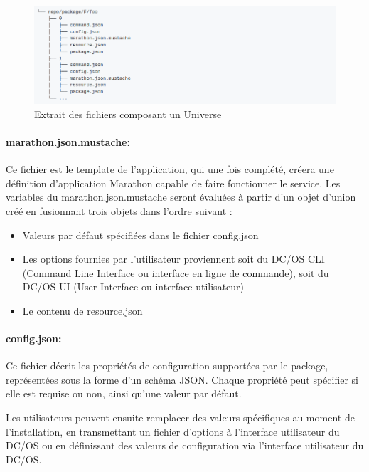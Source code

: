 \documentclass[11pt,fleqn]{book} %
\begin{document}
\begin{figure}[H]\centering
\renewcommand{\figurename}{Capture d'écran}
\includegraphics[scale=0.5,trim={0 0 20cm 0},clip ]{Pictures/Comparaison/deployer/universe/universe-repo.png}
\captionsetup{margin=1.5cm,format=hang,justification=justified}
\caption[]{Extrait des fichiers composant un Universe \newline}
\end{figure}

\paragraph{marathon.json.mustache:} Ce fichier est le template de l'application, qui une fois complété, créera une définition d'application Marathon capable de faire fonctionner le service. Les variables du marathon.json.mustache seront évaluées à partir d'un objet d'union créé en fusionnant trois objets dans l'ordre suivant :
\begin{itemize}
    \item Valeurs par défaut spécifiées dans le fichier config.json
    \item Les options fournies par l'utilisateur proviennent soit du DC/OS CLI (Command Line Interface ou interface en ligne de commande), soit du DC/OS UI (User Interface ou interface utilisateur)
    \item Le contenu de resource.json
\end{itemize}


\paragraph{config.json:} Ce fichier décrit les propriétés de configuration supportées par le package, représentées sous la forme d'un schéma JSON. Chaque propriété peut spécifier si elle est requise ou non, ainsi qu'une valeur par défaut.

Les utilisateurs peuvent ensuite remplacer des valeurs spécifiques au moment de l'installation, en transmettant un fichier d'options à l'interface utilisateur du DC/OS ou en définissant des valeurs de configuration via l'interface utilisateur du DC/OS.
\end{document}
